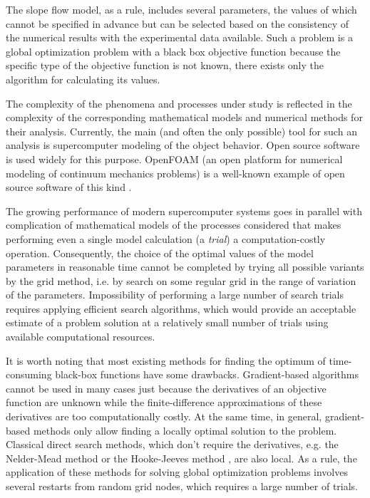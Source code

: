 \documentclass[mathematics,article,submit,pdftex,moreauthors]{Definitions/mdpi}
\begin{document}
The slope flow model, as a rule, includes several parameters, the values of which cannot be specified in advance but can be selected based on the consistency of the numerical results with the experimental data available. Such a problem is a global optimization problem with a black box objective function because the specific type of the objective function is not known, there exists only the algorithm for calculating its values.

The complexity of the phenomena and processes under study is reflected in the complexity of the corresponding mathematical models and numerical methods for their analysis. Currently, the main (and often the only possible) tool for such an analysis is supercomputer modeling of the object behavior. Open source software is used widely for this purpose. OpenFOAM (an open platform for numerical modeling of continuum mechanics problems) is a well-known example of open source software of this kind \cite{Weller1998}. 

The growing performance of modern supercomputer systems goes in parallel with complication of mathematical models of the processes considered that makes performing even a single model calculation (a \textit{trial}) a computation-costly operation. Consequently, the choice of the optimal values of the model parameters in reasonable time cannot be completed by trying all possible variants by the grid method, i.e. by search on some regular grid in the range of variation of the parameters. Impossibility of performing a large number of search trials requires applying efficient search algorithms, which would provide an acceptable estimate of a problem solution at a relatively small number of trials using available computational resources.

It is worth noting that most existing methods for finding the optimum of time-consuming black-box functions have some drawbacks. Gradient-based algorithms cannot be used in many cases just because the derivatives of an objective function are unknown while the finite-difference approximations of these derivatives are too computationally costly. At the same time, in general, gradient-based methods only allow finding a locally optimal solution to the problem.
Classical direct search methods, which don't require the derivatives, e.g. the Nelder-Mead method \cite{NelderMead} or the Hooke-Jeeves method \cite{HookJeeves}, are also local. As a rule, the application of these methods for solving global optimization problems involves several restarts from random grid nodes,  which requires a large number of trials. 
\end{document}
